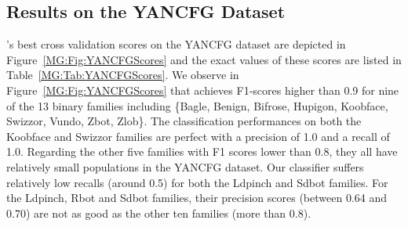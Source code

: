 

\subsection{Results on the YANCFG Dataset}
\sysname's best cross validation scores on the YANCFG dataset are depicted in Figure~\ref{MG:Fig:YANCFGScores} and the exact values of these scores are listed in Table~\ref{MG:Tab:YANCFGScores}.
We observe in Figure~\ref{MG:Fig:YANCFGScores} that \sysname achieves F1-scores higher than 0.9 for nine of the 13 binary families including \{Bagle, Benign, Bifrose, Hupigon, Koobface, Swizzor, Vundo, Zbot, Zlob\}.
The classification performances on both the Koobface and Swizzor families are perfect with a precision of 1.0 and a recall of 1.0.
Regarding the other five families with F1 scores lower than 0.8, they all have relatively small populations in the YANCFG dataset.
Our classifier suffers relatively low recalls (around 0.5) for both the Ldpinch and Sdbot families. For the Ldpinch, Rbot and Sdbot families, their precision scores (between 0.64 and 0.70) are not as good as the other ten families (more than 0.8).

